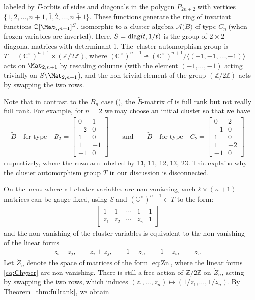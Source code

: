 \documentclass[10pt,a4paper]{amsart}
\def\C{{\mathbb C}}
\def\Z{{\mathbb Z}}
\def\A{{\mathcal{A}}}
\def\Zo{{\mathring{Z}}}
\def\tB{{\tilde B}}
\def\tB{{\tilde B}}
\numberwithin{equation}{section}
\begin{document}
\noindent
labeled by $\Gamma$-orbits of sides and diagonals in the polygon $P_{2n+2}$ with vertices $\{1,2,\dots,n+1,\bar 1, \bar 2, \dots, \overline{n+1}\}$. These functions generate the ring of invariant functions $\C[\Mat_{2,n+1}]^{S}$, isomorphic to a cluster algebra $\A\big(\tB\big)$ of type $C_n$ (when frozen variables are inverted). Here, $S = {\rm diag}(t,1/t)$ is the group of $2 \times 2$ diagonal matrices with determinant 1. The~cluster automorphism group is $T = (\C^\times)^{n+1} \times (\Z/2\Z)$, where $(\C^\times)^{n+1} \cong (\C^\times)^{n+1}/\langle (-1,-1,\dots,-1) \rangle$ acts on
$\Mat_{2,n+1}$ by rescaling columns (with the element $(-1,\dots,-1)$ acting trivially on $S \backslash \Mat_{2,n+1}$), and the non-trivial element of the group $(\Z/2\Z)$ acts by swapping the two rows.
\begin{Remark}
Note that in contrast to the $B_n$ case (\cite[Example 12.10]{CA2}), the $\tB$-matrix of \cite[Example 12.12]{CA2} is full rank but not really full rank. For example, for $n = 2$ we may choose an initial cluster so that we have
\begin{gather*}
\tB\quad \text{for type}\quad B_2= \begin{bmatrix} 0 & 1 \\
-2 & 0 \\
1 & 0 \\
1&-1\\
-1 & 0 \end{bmatrix} \qquad \text{and} \qquad
\tB\quad \text{for type}\quad C_2 = \begin{bmatrix} 0 & 2 \\
-1 & 0 \\
1 & 0 \\
1&-2\\
-1 & 0 \end{bmatrix}
\end{gather*}
respectively, where the rows are labelled by 13, $1\bar 1$, 12, $1 \bar 3$, 23. This explains why the cluster automorphism group $T$ in our discussion is disconnected.
\end{Remark}
On the locus where all cluster variables are non-vanishing, such $2 \times (n+1)$ matrices can be gauge-fixed, using $S$ and $(\C^\times)^{n+1} \subset T$ to the form:
\begin{gather}\label{eq:Zn}
\begin{bmatrix}
1 & 1 & \cdots & 1 &1 \\
z_1 & z_2 & \cdots & z_n & 1
\end{bmatrix}
\end{gather}
and the non-vanishing of the cluster variables is equivalent to the non-vanishing of the linear forms
\begin{gather}\label{eq:Chyper}
z_i - z_j, \qquad z_i + z_j, \qquad 1-z_i, \qquad 1+ z_i, \qquad z_i.
\end{gather}
Let $\Zo_n$ denote the space of matrices of the form \eqref{eq:Zn}, where the linear forms \eqref{eq:Chyper} are non-vanishing. There is still a free action of $\Z/2\Z$ on $\Zo_n$, acting by swapping the two rows, which induces $(z_1,\dots,z_n) \mapsto (1/z_1,\dots,1/z_n)$. By Theorem~\ref{thm:fullrank}, we obtain
\end{document}
